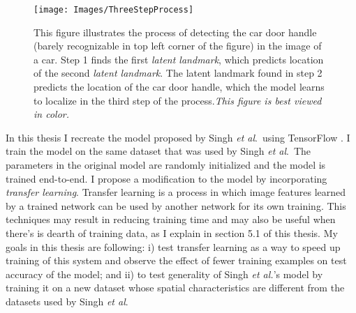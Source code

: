\documentclass [11pt,letterpaper ,twoside ,openany ]{report}
\begin{document}
    \begin{wrapfigure}{l}[9mm]{0.5\textwidth}
        \begin{center}
            \texttt{[image: Images/ThreeStepProcess]}
        \end{center}
        \caption{This figure illustrates the process of detecting the car door handle (barely recognizable in top left corner of the figure) in the image of a car. Step 1 finds the first \textit{latent landmark}, which predicts location of the second \textit{latent landmark}. The latent landmark found in step 2 predicts the location of the car door handle, which the model learns to localize in the third step of the process.\textit{This figure is best viewed in color.}}
    \end{wrapfigure}            

    In this thesis I recreate the model proposed by Singh \textit{et al}.\ using TensorFlow \cite{girija2016tensorflow}. I train the model on the same dataset that was used by Singh \textit{et al}.\ The parameters in the original model are randomly initialized and the model is trained end-to-end. I propose a modification to the model by incorporating \textit {transfer learning}. Transfer learning is a process in which image features learned by a trained network can be used by another network for its own training. This techniques may result in reducing training time and may also be useful when there's is dearth of training data, as I explain in section 5.1 of this thesis. My goals in this thesis are following: i) test transfer learning as a way to speed up training of this system and observe the effect of fewer training examples on test accuracy of the model; and ii) to test generality of Singh \textit{et al.}'s model by training it on a new dataset whose spatial characteristics are different from the datasets used by Singh \textit{et al}.\
\end{document}
